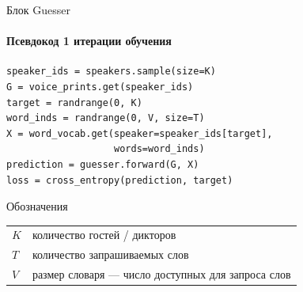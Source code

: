 \documentclass{beamer}
\begin{document}
\begin{frame}[fragile]{Блок Guesser}
\framesubtitle{Псевдокод 1 итерации обучения}
\begin{verbatim}
speaker_ids = speakers.sample(size=K)
G = voice_prints.get(speaker_ids)
target = randrange(0, K)
word_inds = randrange(0, V, size=T)
X = word_vocab.get(speaker=speaker_ids[target],
                   words=word_inds)
prediction = guesser.forward(G, X)
loss = cross_entropy(prediction, target)
\end{verbatim}
    \begin{block}{Обозначения}
    \begin{tabular}{l l}
        $K$ & количество гостей / дикторов\\
        $T$ & количество запрашиваемых слов\\
        $V$ & размер словаря --- число доступных для запроса слов
    \end{tabular}
    \end{block}
\end{frame}
\end{document}
